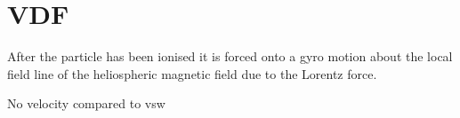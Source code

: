 \section{VDF}
After the particle has been ionised it is forced onto a gyro motion about the local field line of the heliospheric magnetic field due to the Lorentz force. 

No velocity compared to vsw
